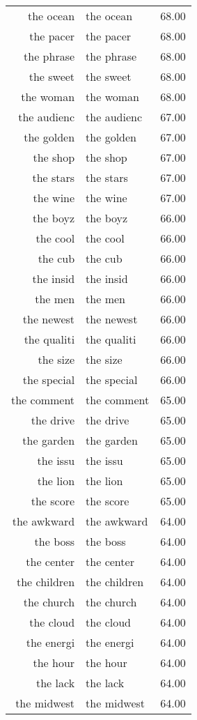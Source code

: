 \begin{table}[ht]
\begin{tabular}{rlr}
  the ocean & the ocean & 68.00 \\ 
  the pacer & the pacer & 68.00 \\ 
  the phrase & the phrase & 68.00 \\ 
  the sweet & the sweet & 68.00 \\ 
  the woman & the woman & 68.00 \\ 
  the audienc & the audienc & 67.00 \\ 
  the golden & the golden & 67.00 \\ 
  the shop & the shop & 67.00 \\ 
  the stars & the stars & 67.00 \\ 
  the wine & the wine & 67.00 \\ 
  the boyz & the boyz & 66.00 \\ 
  the cool & the cool & 66.00 \\ 
  the cub & the cub & 66.00 \\ 
  the insid & the insid & 66.00 \\ 
  the men & the men & 66.00 \\ 
  the newest & the newest & 66.00 \\ 
  the qualiti & the qualiti & 66.00 \\ 
  the size & the size & 66.00 \\ 
  the special & the special & 66.00 \\ 
  the comment & the comment & 65.00 \\ 
  the drive & the drive & 65.00 \\ 
  the garden & the garden & 65.00 \\ 
  the issu & the issu & 65.00 \\ 
  the lion & the lion & 65.00 \\ 
  the score & the score & 65.00 \\ 
  the awkward & the awkward & 64.00 \\ 
  the boss & the boss & 64.00 \\ 
  the center & the center & 64.00 \\ 
  the children & the children & 64.00 \\ 
  the church & the church & 64.00 \\ 
  the cloud & the cloud & 64.00 \\ 
  the energi & the energi & 64.00 \\ 
  the hour & the hour & 64.00 \\ 
  the lack & the lack & 64.00 \\ 
  the midwest & the midwest & 64.00 \\ 

\end{tabular}
\end{table}
